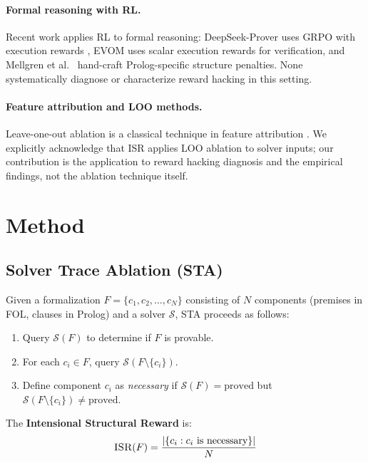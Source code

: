 \documentclass[11pt,a4paper]{article}
\newcommand{\ISR}{\textsc{ISR}}
\newcommand{\STA}{\textsc{STA}}
\newcommand{\GRPO}{\textsc{GRPO}}
\begin{document}
\paragraph{Formal reasoning with RL.}
Recent work applies RL to formal reasoning: DeepSeek-Prover uses \GRPO{} with execution rewards \cite{shao2024deepseekmath}, EVOM \cite{evom2026} uses scalar execution rewards for verification, and Mellgren et al.\ \cite{mellgren2025} hand-craft Prolog-specific structure penalties.
None systematically diagnose or characterize reward hacking in this setting.

\paragraph{Feature attribution and LOO methods.}
Leave-one-out ablation is a classical technique in feature attribution \cite{zeiler2014visualizing}.
We explicitly acknowledge that \ISR{} applies LOO ablation to solver inputs; our contribution is the application to reward hacking diagnosis and the empirical findings, not the ablation technique itself.

\section{Method}
\label{sec:method}

\subsection{Solver Trace Ablation (\STA{})}

Given a formalization $F = \{c_1, c_2, \ldots, c_N\}$ consisting of $N$ components (premises in FOL, clauses in Prolog) and a solver $\mathcal{S}$, \STA{} proceeds as follows:

\begin{enumerate}
\item Query $\mathcal{S}(F)$ to determine if $F$ is provable.
\item For each $c_i \in F$, query $\mathcal{S}(F \setminus \{c_i\})$.
\item Define component $c_i$ as \emph{necessary} if $\mathcal{S}(F) = \text{proved}$ but $\mathcal{S}(F \setminus \{c_i\}) \neq \text{proved}$.
\end{enumerate}

The \textbf{Intensional Structural Reward} is:
\begin{equation}
\ISR{}(F) = \frac{|\{c_i : c_i \text{ is necessary}\}|}{N}
\end{equation}
\end{document}

